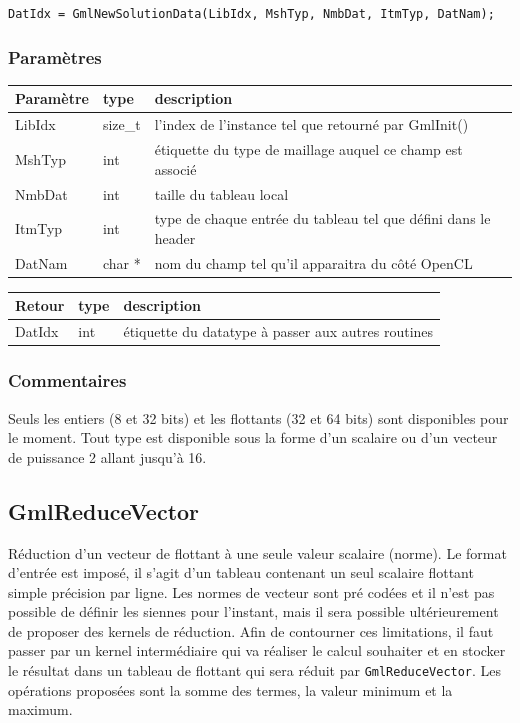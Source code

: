 \documentclass[a4paper,12pt]{article}
\begin{document}
{\tt DatIdx = GmlNewSolutionData(LibIdx, MshTyp, NmbDat, ItmTyp, DatNam);}

\subsubsection*{Paramètres}

\begin{tabular}{|m{2cm}|m{1.5cm}|m{10.5cm}|}
\hline
Paramètre  & type    & description \\
\hline
LibIdx     & size\_t & l'index de l'instance tel que retourné par GmlInit() \\
\hline
MshTyp     & int     & étiquette du type de maillage auquel ce champ est associé \\
\hline
NmbDat     & int     & taille du tableau local \\
\hline
ItmTyp     & int     & type de chaque entrée du tableau tel que défini dans le header \\
\hline
DatNam     & char *  & nom du champ tel qu'il apparaitra du côté OpenCL \\
\hline
\end{tabular}

\medskip

\begin{tabular}{|m{2cm}|m{1.5cm}|m{10.5cm}|}
\hline
Retour     & type   & description \\
\hline
DatIdx     & int    & étiquette du datatype à passer aux autres routines \\
\hline
\end{tabular}

\subsubsection*{Commentaires}
Seuls les entiers (8 et 32 bits) et les flottants (32 et 64 bits) sont disponibles pour le moment.
Tout type est disponible sous la forme d'un scalaire ou d'un vecteur de puissance 2 allant jusqu'à 16.


\subsection{GmlReduceVector}

Réduction d'un vecteur de flottant à une seule valeur scalaire (norme).
Le format d'entrée est imposé, il s'agit d'un tableau contenant un seul scalaire flottant simple précision par ligne.
Les normes de vecteur sont pré codées et il n'est pas possible de définir les siennes pour l'instant, mais il sera possible ultérieurement de proposer des kernels de réduction.
Afin de contourner ces limitations, il faut passer par un kernel intermédiaire qui va réaliser le calcul souhaiter et en stocker le résultat dans un tableau de flottant qui sera réduit par {\tt GmlReduceVector}.
Les opérations proposées sont la somme des termes, la valeur minimum et la maximum.
\end{document}
